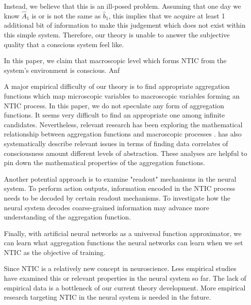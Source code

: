 \documentclass[utf8]{article}
\begin{document}
        Instead, we believe that this is an ill-posed problem. Assuming that one day we know $\hat{A}_1$ is or is not the same as $\hat{b}_1$, this implies that we acquire at least 1 additional bit of information to make this judgement which does not exist within this simple system. Therefore, our theory is unable to answer the subjective quality that a conscious system feel like. 
        
        
        
        In this paper, we claim that macroscopic level which forms NTIC from the system's environment is conscious. Anf
        
    
        A major empirical difficulty of our theory is to find appropriate aggregation functions which map microscopic variables to macroscopic variables forming an NTIC process. In this paper, we do not speculate any form of aggregation functions. It seems very difficult to find an appropriate one among infinite candidates\citep{price2007causation}. Nevertheless, relevant research has been exploring the mathematical relationship between aggregation functions and macroscopic processes \citep{PFANTE.2014}. \cite{Gamez2016} has also
        systematically describe relevant issues in terms of finding data correlates of consciousness amount different levels of abstraction. These analyses are helpful to pin down the mathematical properties of the aggregation functions. 
        
        Another potential approach is to examine "readout" mechanisms in the neural system. To perform action outputs, information encoded in the NTIC process needs to be decoded by certain readout mechanisms. To investigate how the neural system decodes coarse-grained information may advance more understanding of the aggregation function. 
        
        Finally, with artificial neural networks as a universal function approximator, we can learn what aggregation functions the neural networks can learn when we set NTIC as the objective of training. 
        
        Since NTIC is a relatively new concept in neuroscience. Less empirical studies have examined this or relevant properties in the neural system so far. The lack of empirical data is a bottleneck of our current theory development. More empirical research targeting NTIC in the neural system is needed in the future. 
		
\end{document}
